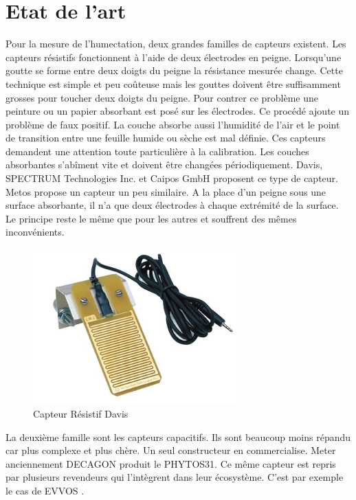 \section{Etat de l'art}
\graphicspath{ {./figuresState} }

Pour la mesure de l'humectation, deux grandes familles de capteurs existent. Les capteurs résistifs fonctionnent à l'aide de deux électrodes en peigne. Lorsqu'une goutte se forme entre deux doigts du peigne la résistance mesurée change. Cette technique est simple et peu coûteuse mais les gouttes doivent être suffisamment grosses pour toucher deux doigts du peigne. Pour contrer ce problème une peinture ou un papier absorbant est posé sur les électrodes. Ce procédé ajoute un problème de faux positif. La couche absorbe aussi l'humidité de l'air et le point de transition entre une feuille humide ou sèche est mal définie. Ces capteurs demandent une attention toute particulière à la calibration. Les couches absorbantes s'abîment vite et doivent être changées périodiquement. Davis\cite{davis}, SPECTRUM Technologies Inc.\cite{spectrum} et Caipos GmbH \cite{caipos} proposent ce type de capteur. Metos propose un capteur un peu similaire. A la place d'un peigne sous une surface absorbante, il n'a que deux électrodes à chaque extrémité de la surface. Le principe reste le même que pour les autres et souffrent des mêmes inconvénients.

\begin{figure}[!ht]
\centering
\includegraphics[width=8cm]{davis}
\caption{Capteur Résistif Davis \cite{davis}}
\end{figure}


La deuxième famille sont les capteurs capacitifs. Ils sont beaucoup moins répandu car plus complexe et plus chère. Un seul constructeur en commercialise. Meter \cite{meter} anciennement DECAGON produit le PHYTOS31. Ce même capteur est repris par plusieurs revendeurs qui l'intègrent dans leur écosystème. C'est par exemple le cas de EVVOS \cite{evvos}.



